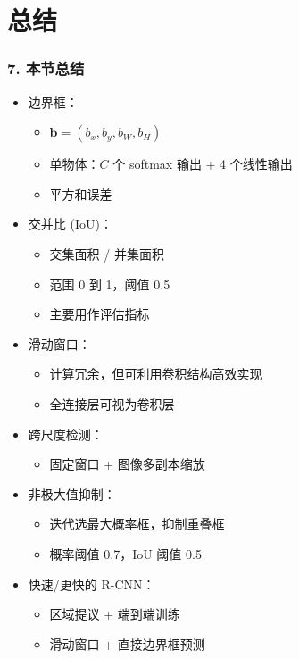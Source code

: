 \documentclass[t,aspectratio=169]{beamer} %
\begin{document}
\section{总结}

\begin{frame}[allowframebreaks]
    \frametitle{7. 本节总结}
    \begin{itemize}
        \item \alert{边界框}：
        \begin{itemize}
            \item $\mathbf{b} = (b_x, b_y, b_W, b_H)$
            \item 单物体：$C$ 个 softmax 输出 + 4 个线性输出
            \item 平方和误差
        \end{itemize}
        \item \alert{交并比 (IoU)}：
        \begin{itemize}
            \item 交集面积 / 并集面积
            \item 范围 0 到 1，阈值 0.5
            \item 主要用作评估指标
        \end{itemize}
        \item \alert{滑动窗口}：
        \begin{itemize}
            \item 计算冗余，但可利用卷积结构高效实现
            \item 全连接层可视为卷积层
        \end{itemize}
        \item \alert{跨尺度检测}：
        \begin{itemize}
            \item 固定窗口 + 图像多副本缩放
        \end{itemize}
        \item \alert{非极大值抑制}：
        \begin{itemize}
            \item 迭代选最大概率框，抑制重叠框
            \item 概率阈值 0.7，IoU 阈值 0.5
        \end{itemize}
        \item \alert{快速/更快的 R-CNN}：
        \begin{itemize}
            \item 区域提议 + 端到端训练
            \item 滑动窗口 + 直接边界框预测
        \end{itemize}
    \end{itemize}
\end{frame}
\end{document}
